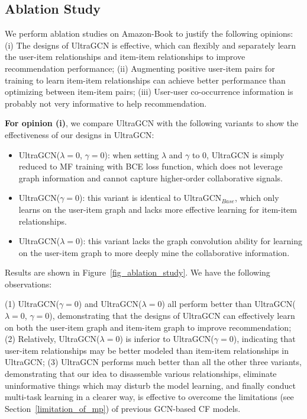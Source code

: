 \documentclass[sigconf,authorversion]{acmart}
\begin{document}
\subsection{Ablation Study}
\label{sec::ablation_study}
We perform ablation studies on Amazon-Book to justify the following opinions:
(i) The designs of UltraGCN is effective, which can flexibly and separately learn the user-item relationships and item-item relationships to improve recommendation performance;
(ii) Augmenting positive user-item pairs for training to learn item-item relationships can achieve better performance than optimizing between item-item pairs; 
(iii) User-user co-occurrence information is probably not very informative to help recommendation.

\textbf{For opinion (i)}, we compare UltraGCN with the following variants to show the effectiveness of our designs in UltraGCN:
\begin{itemize}
	\item UltraGCN($\lambda=0$, $\gamma=0$): when setting $\lambda$ and $\gamma$ to 0, UltraGCN is simply reduced to MF training with BCE loss function, which does not leverage graph information and cannot capture higher-order collaborative signals.
	\item UltraGCN($\gamma=0$): this variant is identical to UltraGCN$_{Base}$, which only learns on the user-item graph and lacks more effective learning for item-item relationships.
	\item UltraGCN($\lambda=0$): this variant lacks the graph convolution ability for learning on the user-item graph to more deeply mine the collaborative information.
\end{itemize}
Results are shown in Figure~\ref{fig_ablation_study}. We have the following observations:

(1) UltraGCN($\gamma=0$) and UltraGCN($\lambda=0$) all perform better than UltraGCN($\lambda=0$, $\gamma=0$), demonstrating that the designs of UltraGCN can effectively learn on both the user-item graph and item-item graph to improve recommendation;
(2) Relatively, UltraGCN($\lambda=0$) is inferior to UltraGCN($\gamma=0$), indicating that  
user-item relationships may be better modeled than item-item relationships in UltraGCN;
(3) UltraGCN performs much better than all the other three variants, demonstrating that our idea to disassemble various relationships, eliminate uninformative things which may disturb the model learning, and finally conduct multi-task learning in a clearer way, is effective to overcome the limitations (see Section~\ref{limitation_of_mp}) of previous GCN-based CF models. 
\end{document}
